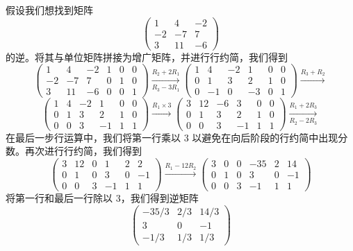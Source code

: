 假设我们想找到矩阵
$$
\begin{pmatrix} 1 & 4 & -2 \\ -2 & -7 & 7 \\ 3 & 11 & -6 \end{pmatrix}
$$
的逆。将其与单位矩阵拼接为增广矩阵，并进行行约简，我们得到
$$
\left(\begin{array}{ccc|ccc} 1 & 4 & -2 & 1 & 0 & 0 \\ -2 & -7 & 7 & 0 & 1 & 0 \\ 3 & 11 & -6 & 0 & 0 & 1 \end{array}\right) \xrightarrow[{R_3-3R_1}]{R_2+2R_1} \left(\begin{array}{ccc|ccc} 1 & 4 & -2 & 1 & 0 & 0 \\ 0 & 1 & 3 & 2 & 1 & 0 \\ 0 & -1 & 0 & -3 & 0 & 1 \end{array}\right) \xrightarrow{R_3+R_2}
$$
$$
\left(\begin{array}{ccc|ccc} 1 & 4 & -2 & 1 & 0 & 0 \\ 0 & 1 & 3 & 2 & 1 & 0 \\ 0 & 0 & 3 & -1 & 1 & 1 \end{array}\right)
\xrightarrow{R_1\times 3} \left(\begin{array}{ccc|ccc} 3 & 12 & -6 & 3 & 0 & 0 \\ 0 & 1 & 3 & 2 & 1 & 0 \\ 0 & 0 & 3 & -1 & 1 & 1 \end{array}\right) \xrightarrow[R_2-2R_3]{R_1+2R_3}
$$
在最后一步行运算中，我们将第一行乘以 3 以避免在向后阶段的行约简中出现分数。再次进行行约简，我们得到
$$
\left(\begin{array}{ccc|ccc} 3 & 12 & 0 & 1 & 2 & 2 \\ 0 & 1 & 0 & 3 & 0 & -1 \\ 0 & 0 & 3 & -1 & 1 & 1 \end{array}\right) \xrightarrow{R_1-12R_2} \left(\begin{array}{ccc|ccc} 3 & 0 & 0 & -35 & 2 & 14 \\ 0 & 1 & 0 & 3 & 0 & -1 \\ 0 & 0 & 3 & -1 & 1 & 1 \end{array}\right)
$$
将第一行和最后一行除以 3，我们得到逆矩阵
$$
\begin{pmatrix} -35/3 & 2/3 & 14/3 \\ 3 & 0 & -1 \\ -1/3 & 1/3 & 1/3 \end{pmatrix}
$$

